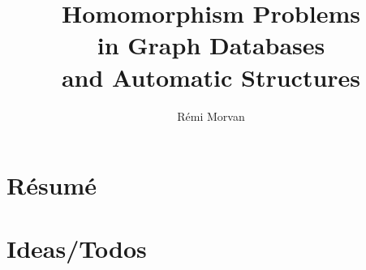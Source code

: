 \documentclass[a4paper,sfsidenotes,twoside,justified,nobib]{tufte-book-custom}
\title[Homomorphism Problems]{Homomorphism Problems\\in Graph Databases\\ and Automatic Structures}
\author{Rémi Morvan}
\begin{document}
\frontmatter





\mainmatter

\chapter*{Résumé}

\chapter*{Ideas/Todos}
\end{document}

